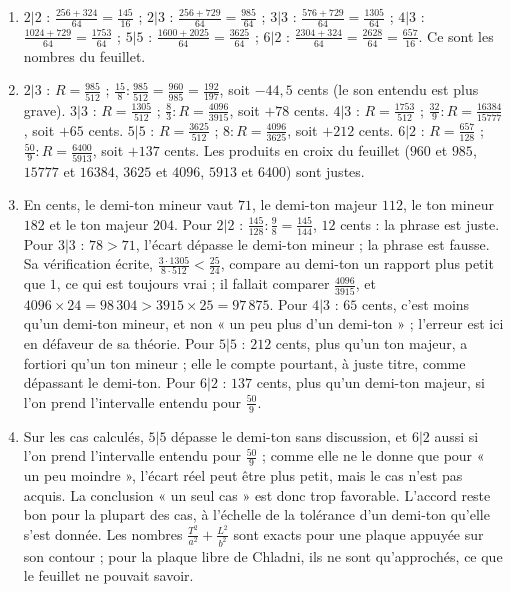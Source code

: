 \documentclass[11pt,a4paper]{article}
\begin{document}
\begin{solution}
\begin{enumerate}
\item $2|2$ : $\frac{256+324}{64} = \frac{145}{16}$ ; $2|3$ : $\frac{256+729}{64} =
  \frac{985}{64}$ ; $3|3$ : $\frac{576+729}{64} = \frac{1305}{64}$ ; $4|3$ :
  $\frac{1024+729}{64} = \frac{1753}{64}$ ; $5|5$ : $\frac{1600+2025}{64} =
  \frac{3625}{64}$ ; $6|2$ : $\frac{2304+324}{64} = \frac{2628}{64} = \frac{657}{16}$.
  Ce sont les nombres du feuillet.
\item $2|3$ : $R = \frac{985}{512}$ ; $\frac{15}{8} : \frac{985}{512} = \frac{960}{985}
  = \frac{192}{197}$, soit $-44{,}5$ cents (le son entendu est plus grave). $3|3$ :
  $R = \frac{1305}{512}$ ; $\frac83 : R = \frac{4096}{3915}$, soit $+78$ cents. $4|3$ :
  $R = \frac{1753}{512}$ ; $\frac{32}{9} : R = \frac{16384}{15777}$, soit $+65$ cents.
  $5|5$ : $R = \frac{3625}{512}$ ; $8 : R = \frac{4096}{3625}$, soit $+212$ cents.
  $6|2$ : $R = \frac{657}{128}$ ; $\frac{50}{9} : R = \frac{6400}{5913}$, soit
  $+137$ cents. Les produits en croix du feuillet ($960$ et $985$, $15777$ et $16384$,
  $3625$ et $4096$, $5913$ et $6400$) sont justes.
\item En cents, le demi-ton mineur vaut $71$, le demi-ton majeur $112$, le ton mineur
  $182$ et le ton majeur $204$. Pour $2|2$ : $\frac{145}{128} : \frac98 =
  \frac{145}{144}$, $12$ cents : la phrase est juste. Pour $3|3$ : $78 > 71$, l'écart
  dépasse le demi-ton mineur ; la phrase est fausse. Sa vérification écrite,
  $\frac{3\cdot1305}{8\cdot512} < \frac{25}{24}$, compare au demi-ton un rapport plus
  petit que $1$, ce qui est toujours vrai ; il fallait comparer
  $\frac{4096}{3915}$, et $4096\times24 = 98\,304 > 3915\times25 = 97\,875$. Pour
  $4|3$ : $65$ cents, c'est moins qu'un demi-ton mineur, et non « un peu plus d'un
  demi-ton » ; l'erreur est ici en défaveur de sa théorie. Pour $5|5$ : $212$ cents,
  plus qu'un ton majeur, a fortiori qu'un ton mineur ; elle le compte pourtant, à juste
  titre, comme dépassant le demi-ton. Pour $6|2$ : $137$ cents, plus qu'un demi-ton
  majeur, si l'on prend l'intervalle entendu pour $\frac{50}{9}$.
\item Sur les cas calculés, $5|5$ dépasse le demi-ton sans discussion, et $6|2$ aussi
  si l'on prend l'intervalle entendu pour $\frac{50}{9}$ ; comme elle ne le donne que
  pour « un peu moindre », l'écart réel peut être plus petit, mais le cas n'est pas
  acquis. La conclusion « un seul cas » est donc trop favorable. L'accord reste bon
  pour la plupart des cas, à l'échelle de la tolérance d'un demi-ton qu'elle s'est
  donnée. Les nombres $\frac{T^2}{a^2} + \frac{L^2}{b^2}$ sont exacts pour une plaque
  appuyée sur son contour ; pour la plaque libre de Chladni, ils
  ne sont qu'approchés, ce que le feuillet ne pouvait savoir.
\end{enumerate}


\end{solution}
\end{document}
